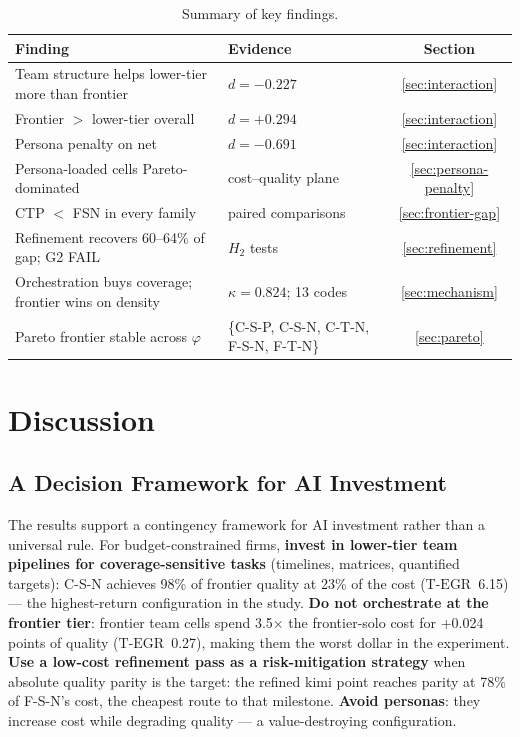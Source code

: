 \documentclass[12pt,a4paper]{article}
\newcommand{\phiBlend}{\varphi}
\newcommand{\TEGR}{\ensuremath{\text{T-EGR}}}
\begin{document}
\begin{table}[ht]
  \centering
  \caption{Summary of key findings.}
  \label{tab:summary-findings}
  \begin{tabularx}{\textwidth}{@{}l l c@{}}
    \toprule
    \textbf{Finding} & \textbf{Evidence} & \textbf{Section} \\
    \midrule
    Team structure helps lower-tier more than frontier & $d = -0.227$ & \cref{sec:interaction} \\
    Frontier $>$ lower-tier overall & $d = +0.294$ & \cref{sec:interaction} \\
    Persona penalty on net & $d = -0.691$ & \cref{sec:interaction} \\
    Persona-loaded cells Pareto-dominated & cost--quality plane & \cref{sec:persona-penalty} \\
    CTP $<$ FSN in every family & paired comparisons & \cref{sec:frontier-gap} \\
    Refinement recovers 60--64\% of gap; G2 FAIL & $H_2$ tests & \cref{sec:refinement} \\
    Orchestration buys coverage; frontier wins on density & $\kappa = 0.824$; 13 codes & \cref{sec:mechanism} \\
    Pareto frontier stable across $\phiBlend$ & \{C-S-P, C-S-N, C-T-N, F-S-N, F-T-N\} & \cref{sec:pareto} \\
    \bottomrule
  \end{tabularx}
\end{table}

\section{Discussion}\label{sec:discussion}

\subsection{A Decision Framework for AI Investment}\label{sec:decision-framework}

The results support a contingency framework for AI investment rather than a
universal rule. For budget-constrained firms, \textbf{invest in lower-tier team
pipelines for coverage-sensitive tasks} (timelines, matrices, quantified
targets): C-S-N achieves 98\% of frontier quality at 23\% of the cost
($\TEGR$~6.15) --- the highest-return configuration in the study. \textbf{Do not
orchestrate at the frontier tier}: frontier team cells spend 3.5$\times$ the
frontier-solo cost for +0.024 points of quality ($\TEGR$~0.27), making them the
worst dollar in the experiment. \textbf{Use a low-cost refinement pass as a
risk-mitigation strategy} when absolute quality parity is the target: the
refined kimi point reaches parity at 78\% of F-S-N's cost, the cheapest route to
that milestone. \textbf{Avoid personas}: they increase cost while degrading
quality --- a value-destroying configuration.
\end{document}
